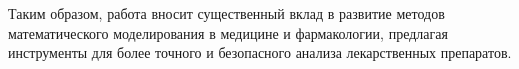 \documentclass[oneside,senior,etd]{BYUPhys}
\begin{document}
Таким образом, работа вносит существенный вклад в развитие методов математического моделирования в медицине и фармакологии, предлагая инструменты для более точного и безопасного анализа лекарственных препаратов.

\raggedright

\nocite{*}


\end{document}
